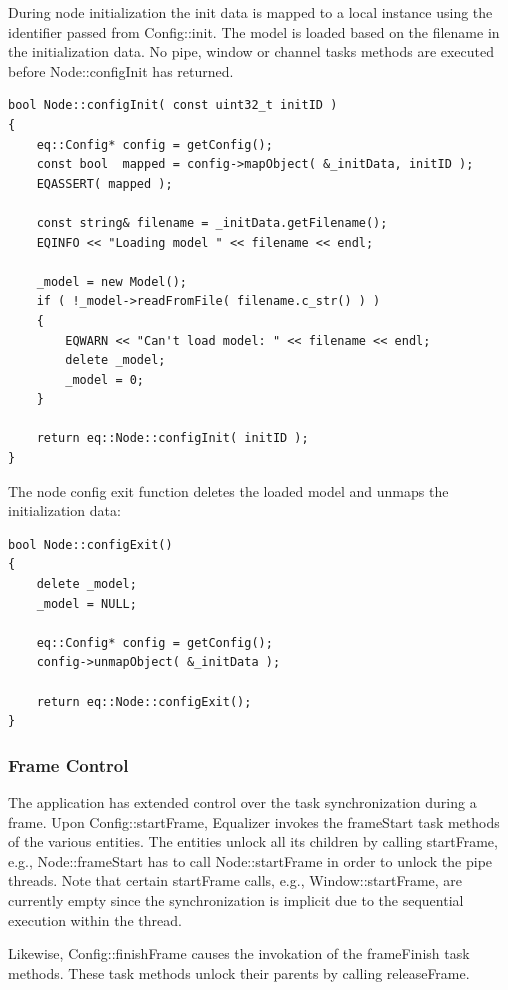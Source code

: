 \documentclass[10pt,a4]{scrartcl}
\begin{document}
During node initialization the init data is mapped to a local instance
using the identifier passed from \textsf{Config::init}. The model is
loaded based on the filename in the initialization data. No pipe, window
or channel tasks methods are executed before \textsf{Node::configInit}
has returned.

{\footnotesize\begin{lstlisting}
bool Node::configInit( const uint32_t initID )
{
    eq::Config* config = getConfig();
    const bool  mapped = config->mapObject( &_initData, initID );
    EQASSERT( mapped );

    const string& filename = _initData.getFilename();
    EQINFO << "Loading model " << filename << endl;

    _model = new Model();
    if ( !_model->readFromFile( filename.c_str() ) )
    {
        EQWARN << "Can't load model: " << filename << endl;
        delete _model;
        _model = 0;
    }
    
    return eq::Node::configInit( initID );
}
\end{lstlisting}}%

The node config exit function deletes the loaded model and unmaps the
initialization data: 

{\footnotesize\begin{lstlisting}
bool Node::configExit()
{
    delete _model;
    _model = NULL;

    eq::Config* config = getConfig();
    config->unmapObject( &_initData );

    return eq::Node::configExit();
}
\end{lstlisting}}

\subsubsection{\label{sNodeFrame}Frame Control}

The application has extended control over the task synchronization
during a frame. Upon \textsf{Config::startFrame}, Equalizer invokes the
\textsf{frameStart} task methods of the various entities. The entities
unlock all its children by calling \textsf{startFrame}, e.g.,
\textsf{Node::frameStart} has to call \textsf{Node::startFrame} in order
to unlock the pipe threads. Note that certain \textsf{startFrame} calls,
e.g., \textsf{Window::startFrame}, are currently empty since the
synchronization is implicit due to the sequential execution within the
thread.

Likewise, \textsf{Config::finishFrame} causes the invokation of the
\textsf{frameFinish} task methods. These task methods unlock their
parents by calling \textsf{releaseFrame}.
\end{document}
